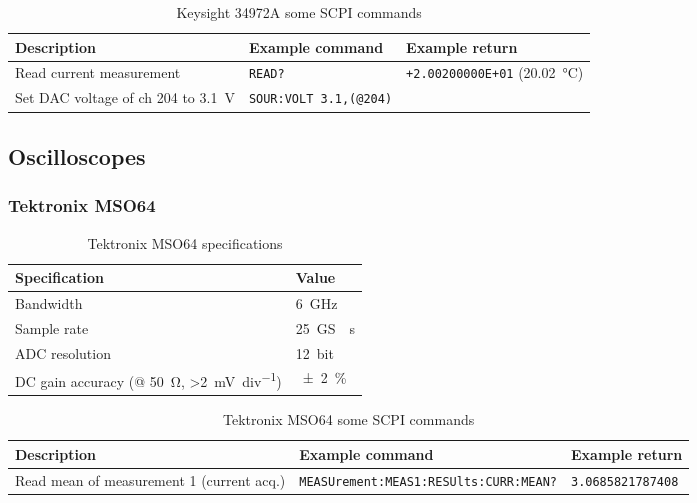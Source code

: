 \begin{table}[H]
	\centering
	\caption{Keysight 34972A some SCPI commands}
	\label{tab:keysight-34972A-scpi}
	\begin{tabularx}{\textwidth}{Xll}
		\toprule
		\textbf{Description} & \textbf{Example command} & \textbf{Example return}\\
		\midrule
		Read current measurement & \texttt{READ?} & \texttt{+2.00200000E+01} (\SI{20.02}{\degreeCelsius})\\
		Set DAC voltage of ch 204 to \SI{3.1}{\volt} & \texttt{SOUR:VOLT 3.1,(@204)} & \\
		\bottomrule
	\end{tabularx}
\end{table}


\subsection{Oscilloscopes}
\subsubsection{Tektronix MSO64}\label{app:tektronix-MSO64}
\begin{table}[H]
	\centering
	\caption{Tektronix MSO64 specifications}
	\label{tab:tektronix-MSO64-specs}
	\begin{tabularx}{\textwidth}{ll}
		\toprule
		\textbf{Specification} & \textbf{Value}\\
		\midrule
		Bandwidth & \SI{6}{\GHz} \\
		Sample rate & \SI{25}{\giga S \per\second}\\
		ADC resolution & \SI{12}{bit}\\
		DC gain accuracy (@ \SI{50}{\ohm}, >\SI{2}{\mV\per div}) & \SI{+-2}{\percent}\\
		\bottomrule
	\end{tabularx}
\end{table}

\begin{table}[H]
	\centering
	\caption{Tektronix MSO64 some SCPI commands}
	\label{tab:tektronix-MSO64-scpi}
	\begin{tabularx}{\textwidth}{Xll}
		\toprule
		\textbf{Description} & \textbf{Example command} & \textbf{Example return}\\
		\midrule
		Read mean of measurement 1 (current acq.) & \texttt{MEASUrement:MEAS1:RESUlts:CURR:MEAN?} & \texttt{3.0685821787408} \\
		\bottomrule
	\end{tabularx}
\end{table}

